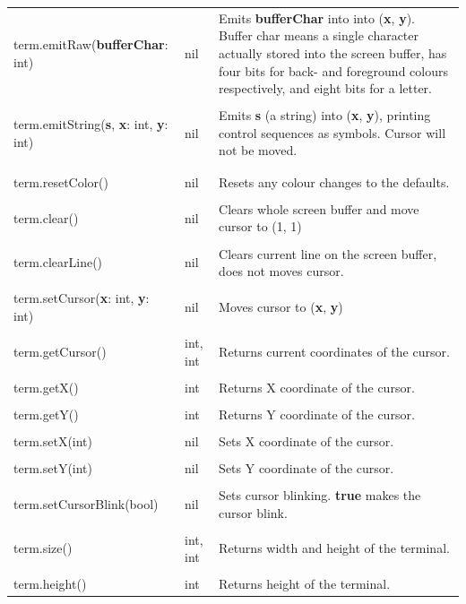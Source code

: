\begin{tabularx}{\textwidth}{l l X}
	term.emitRaw(\textbf{bufferChar}: int) & nil & Emits \textbf{bufferChar} into into (\textbf{x}, \textbf{y}). Buffer char means a single character actually stored into the screen buffer, has four bits for back- and foreground colours respectively, and eight bits for a letter.
	\\ \\
	term.emitString(\textbf{s}, \textbf{x}: int, \textbf{y}: int) & nil & Emits \textbf{s} (a string) into (\textbf{x}, \textbf{y}), printing control sequences as symbols. Cursor will not be moved.
	\\ \\
	\begin{tabular}[t]{@{}l@{}}term.resetColour()\\term.resetColor()\end{tabular} & nil & Resets any colour changes to the defaults.
	\\ \\
	term.clear() & nil & Clears whole screen buffer and move cursor to (1, 1)
	\\ \\
	term.clearLine() & nil & Clears current line on the screen buffer, does not moves cursor.
	\\ \\
	term.setCursor(\textbf{x}: int, \textbf{y}: int) & nil & Moves cursor to (\textbf{x}, \textbf{y})
	\\ \\
	term.getCursor() & int, int & Returns current coordinates of the cursor.
	\\ \\
	term.getX() & int & Returns X coordinate of the cursor.
	\\ \\
	term.getY() & int & Returns Y coordinate of the cursor.
	\\ \\
	term.setX(int) & nil & Sets X coordinate of the cursor.
	\\ \\
	term.setY(int) & nil & Sets Y coordinate of the cursor.
	\\ \\
	term.setCursorBlink(bool) & nil & Sets cursor blinking. \textbf{true} makes the cursor blink.
	\\ \\
	term.size() & int, int & Returns width and height of the terminal.
	\\ \\
	term.height() & int & Returns height of the terminal. 

\end{tabularx}
